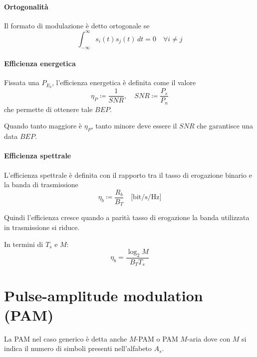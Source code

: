 \documentclass{article}
\begin{document}
\paragraph*{Ortogonalità}

Il formato di modulazione è detto ortogonale se
\begin{equation*}
    \int_{-\infty}^{\infty} s_{i}(t) s_{j}(t) \, dt = 0 \quad \forall i \neq j
\end{equation*}

\paragraph*{Efficienza energetica}

Fissata una \( P_{E_{b}} \), l'efficienza energetica è definita come il valore
\begin{equation*}
    \eta_{P} \coloneqq \frac{1}{SNR} , \quad SNR \coloneqq \frac{P_{s}}{P_{n}}
\end{equation*}
che permette di ottenere tale \( BEP \).

Quando tanto maggiore è \( \eta_{P} \), tanto minore deve essere il \( SNR \) che garantisce una data \( BEP \).

\paragraph*{Efficienza spettrale}

L'efficienza spettrale è definita con il rapporto tra il tasso di erogazione binario e la banda di trasmissione
\begin{equation*}
    \eta_{b} \coloneqq \frac{R_{b}}{B_{T}} \quad \text{[bit/s/Hz]}
\end{equation*}

Quindi l'efficienza cresce quando a parità tasso di erogazione la banda utilizzata in trasmissione si riduce.

In termini di \( T_{s} \) e \( M \):
\begin{equation*}
    \eta_{b} = \frac{\log_2 M}{B_{T} T_{s}}
\end{equation*}


\section*{Pulse-amplitude modulation (PAM)}

La PAM nel caso generico è detta anche \( M \)-PAM o PAM \( M \)-aria dove con \( M \) si indica il numero di simboli presenti nell'alfabeto \( A_s \).
\end{document}
